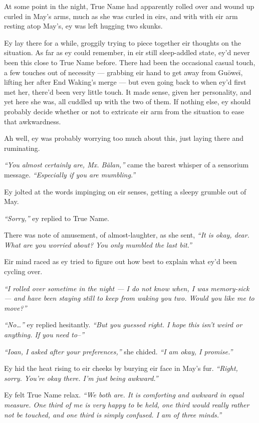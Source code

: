 At some point in the night, True Name had apparently rolled over and wound up curled in May's arms, much as she was curled in eirs, and with with eir arm resting atop May's, ey was left hugging two skunks.

Ey lay there for a while, groggily trying to piece together eir thoughts on the situation. As far as ey could remember, in eir still sleep-addled state, ey'd never been this close to True Name before. There had been the occasional casual touch, a few touches out of necessity — grabbing eir hand to get away from Guōweī, lifting her after End Waking's merge — but even going back to when ey'd first met her, there'd been very little touch. It made sense, given her personality, and yet here she was, all cuddled up with the two of them. If nothing else, ey should probably decide whether or not to extricate eir arm from the situation to ease that awkwardness.

Ah well, ey was probably worrying too much about this, just laying there and ruminating.

\emph{``You almost certainly are, Mx. Bălan,''} came the barest whisper of a sensorium message. \emph{``Especially if you are mumbling.''}

Ey jolted at the words impinging on eir senses, getting a sleepy grumble out of May.

\emph{``Sorry,''} ey replied to True Name.

There was note of amusement, of almost-laughter, as she sent, \emph{``It is okay, dear. What are you worried about? You only mumbled the last bit.''}

Eir mind raced as ey tried to figure out how best to explain what ey'd been cycling over.

\emph{``I rolled over sometime in the night — I do not know when, I was memory-sick — and have been staying still to keep from waking you two. Would you like me to move?''}

\emph{``No\ldots{}''} ey replied hesitantly. \emph{``But you guessed right. I hope this isn't weird or anything. If you need to--''}

\emph{``Ioan, I asked after your preferences,''} she chided. \emph{``I am okay, I promise.''}

Ey hid the heat rising to eir cheeks by burying eir face in May's fur. \emph{``Right, sorry. You're okay there. I'm just being awkward.''}

Ey felt True Name relax. \emph{``We both are. It is comforting and awkward in equal measure. One third of me is very happy to be held, one third would really rather not be touched, and one third is simply confused. I am of three minds.''}

